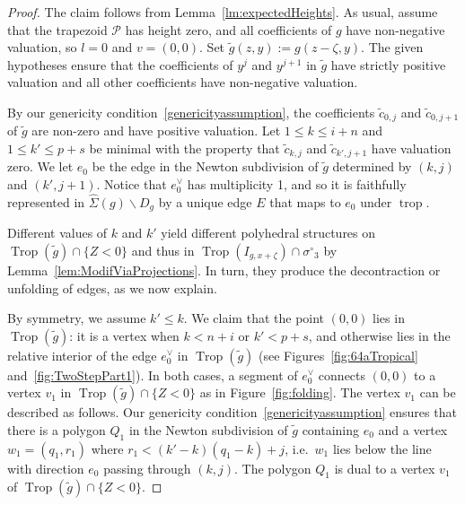 \documentclass[11pt]{amsart}
\numberwithin{equation}{section}
\theoremstyle{plain}
\theoremstyle{definition}
\theoremstyle{remark}
\begin{document}
\begin{proof}
  The claim follows from Lemma~\ref{lm:expectedHeights}.  As usual,
  assume that the trapezoid ${\mathcal{P}}$ has height zero, and all
  coefficients of $g$ have non-negative valuation, so $l=0$ and
  $v=(0,0)$.  Set $\tilde{g}(z,y):=g(z-{\zeta},y)$.  The given hypotheses
  ensure that the coefficients of $y^j$ and $y^{j+1}$ in $\tilde{g}$
  have strictly positive valuation and all other coefficients have
  non-negative valuation.

  By our genericity condition~\ref{genericityassumption}, the
  coefficients $\tilde{c}_{0,j}$ and $\tilde{c}_{0,j+1}$ of
  $\tilde{g}$ are non-zero and have positive valuation. Let $1\leq
  k\leq i+n$ and $1\leq k'\leq p+s$ be minimal with the property that
  $\tilde{c}_{{k,j}}$ and $\tilde{c}_{k',j+1}$ have valuation zero. We
  let $e_0$ be the edge in the Newton subdivision of $\tilde{g}$
  determined by $(k,j)$ and $(k',j+1)$. Notice that $e_0^{\vee}$ has
  multiplicity 1, and so it is faithfully represented in
  $\widehat{\Sigma}(g)\smallsetminus D_g$ by a unique edge $E$ that
  maps to $e_0$ under $\operatorname{trop}$.

  Different values of $k$ and
  $k'$ yield different polyhedral structures on $\operatorname{Trop}(\tilde{g})\cap
  \{Z<0\}$ and thus in $\operatorname{Trop}(I_{g,x+{\zeta}})\cap {\sigma^{\circ}}_3$ by
  Lemma~\ref{lem:ModifViaProjections}.  In turn, they produce the
  decontraction or unfolding of edges, as we now explain.

  By symmetry, we assume $k'\leq k$. We claim that the point $(0,0)$
  lies in $\operatorname{Trop}(\tilde{g})$: it is a vertex when $k<n+i$ or $k'<p+s$,
  and otherwise lies in the relative interior of the edge $e_0^{\vee}$
  in $\operatorname{Trop}(\tilde{g})$ (see Figures~\ref{fig:64aTropical}
  and~\ref{fig:TwoStepPart1}). In both cases, a segment of
  $e_0^{\vee}$ connects $(0,0)$ to a vertex $v_1$ in
  $\operatorname{Trop}(\tilde{g})\cap \{Z<0\}$ as in Figure~\ref{fig:folding}.  The
  vertex $v_1$ can be described as follows.  Our genericity
  condition~\ref{genericityassumption} ensures that there is a polygon
  $Q_1$ in the Newton subdivision of $\tilde{g}$ containing $e_0$ and
  a vertex $w_1=(q_1,r_1)$ where $r_1<(k'-k)(q_1-k)+j$, i.e.\ $w_1$
  lies below the line with direction $e_0$ passing through $(k,j)$.
  The polygon $Q_1$ is dual to a vertex $v_1$ of $\operatorname{Trop}(\tilde{g})\cap
  \{Z<0\}$. 


\end{proof}
\end{document}
